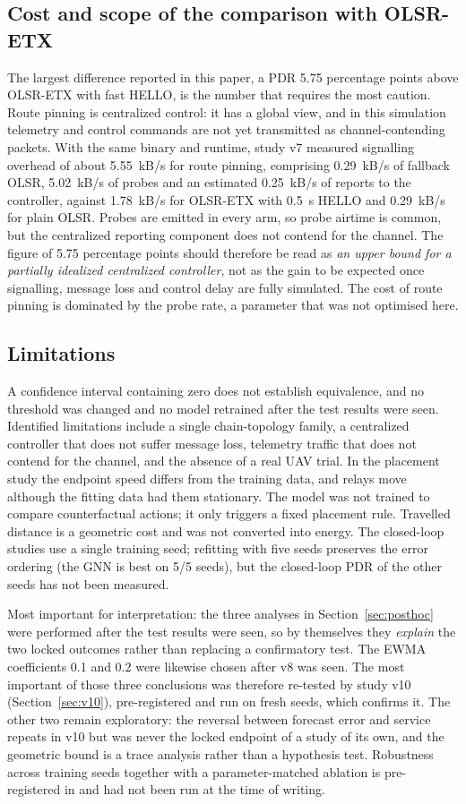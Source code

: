 \documentclass[11pt,a4paper]{article}
\newcommand{\code}[1]{\texttt{\detokenize{#1}}}
\begin{document}
\subsection{Cost and scope of the comparison with OLSR-ETX}
The largest difference reported in this paper, a PDR 5.75 percentage points
above OLSR-ETX with fast HELLO, is the number that requires the most caution.
Route pinning is centralized control: it has a global view, and in this
simulation telemetry and control commands are not yet transmitted as
channel-contending packets. With the same binary and runtime, study v7 measured
signalling overhead of about 5.55~kB/s for route pinning, comprising 0.29~kB/s
of fallback OLSR, 5.02~kB/s of probes and an estimated 0.25~kB/s of reports to
the controller, against 1.78~kB/s for OLSR-ETX with 0.5~s HELLO and 0.29~kB/s
for plain OLSR. Probes are emitted in every arm, so probe airtime is common,
but the centralized reporting component does not contend for the channel.
The figure of 5.75 percentage points should therefore be read as \emph{an upper
bound for a partially idealized centralized controller}, not as the gain to be
expected once signalling, message loss and control delay are fully simulated.
The cost of route pinning is dominated by the probe rate, a parameter that was
not optimised here.

\subsection{Limitations}
A confidence interval containing zero does not establish equivalence, and no
threshold was changed and no model retrained after the test results were seen.
Identified limitations include a single chain-topology family, a centralized
controller that does not suffer message loss, telemetry traffic that does not
contend for the channel, and the absence of a real UAV trial. In the placement
study the endpoint speed differs from the training data, and relays move
although the fitting data had them stationary. The model was not trained to
compare counterfactual actions; it only triggers a fixed placement rule.
Travelled distance is a geometric cost and was not converted into energy. The
closed-loop studies use a single training seed; refitting with five seeds
preserves the error ordering (the GNN is best on 5/5 seeds), but the closed-loop
PDR of the other seeds has not been measured.

Most important for interpretation: the three analyses in
Section~\ref{sec:posthoc} were performed after the test results were seen, so by
themselves they \emph{explain} the two locked outcomes rather than replacing a
confirmatory test. The EWMA coefficients 0.1 and 0.2 were likewise chosen after
v8 was seen. The most important of those three conclusions was therefore
re-tested by study v10 (Section~\ref{sec:v10}), pre-registered and run on fresh
seeds, which confirms it. The other two remain exploratory: the reversal between
forecast error and service repeats in v10 but was never the locked endpoint of a
study of its own, and the geometric bound is a trace analysis rather than a
hypothesis test. Robustness across training seeds together with a
parameter-matched ablation is pre-registered in
\code{docs/service_v11_protocol.md} and had not been run at the time of writing.
\end{document}
